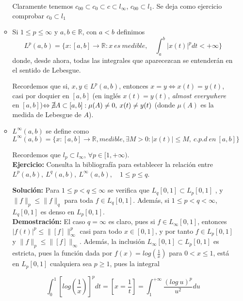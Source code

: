\documentclass{article}
\begin{document}
\begin{enumerate}
\begin{itemize}
	Claramente tenemos $c_{00}\subset c_0\subset c\subset l_{\infty}$, $c_{00}\subset l_1$. Se deja como ejercicio comprobar $c_0\subset l_1$
	
	\item Si $1\leq p\leq \infty $ y $a,b\in \mathbb{R}$, con $a<b$ definimos
	\begin{equation}
	L^p(a,b)=\{x:[a,b]\rightarrow \mathbb{R}:x\:es\:medible,\quad \int_a^b|x(t)|^p dt<+\infty \}
	\end{equation}
	donde, desde ahora, todas las integrales que aparecezcan se entenderán en el sentido de Lebesgue.
	
	Recordemos que si, $x,y\in L^p(a,b)$, entonces $x=y\Leftrightarrow x(t)=y(t)$, casi por doquier en $[a,b]$ (en inglés $x(t)=y(t)$, \textit{almost everywhere} en $[a,b]$)$\Leftrightarrow \cancel{\exists} A\subset [a,b]:\mu(A)\neq0,\:x(t)\neq y(t)$ (donde $\mu(A)$ es la medida de Lebesgue de $A$).
	
	\item $L^\infty(a,b)$ se define como
	\begin{equation*}
	L^\infty(a,b)=\{x:[a,b]\rightarrow \mathbb{R},medible,\exists M>0:|x(t)|\leq M,\:c.p.d\:en\:[a,b]\}
	\end{equation*}	
	
	Recordemos que $l_p\subset l_\infty$, $\forall p\in [1,+\infty)$.\\
	
	\textbf{Ejercicio:} Consulta la bibliografía para establecer la relación entre $L^p(a,b),\:L^q(a,b),\:L^\infty (a,b),\quad 1\leq p\leq q$.
	
	\textbf{Solución:} Para $1\leq p < q \leq \infty$ se verifica que $L_q[0,1] \subset L_p[0,1]$ , y $\|f\|_p\leq \|f\|_q$ para toda $f\in L_q[0,1]$. Además, si $1\leq p<q<\infty$, $L_q[0,1]$ es denso en $L_p[0,1]$. \\
	
	\textbf{Demostración:} El caso $q=\infty$ es claro, pues si $f\in L_\infty[0,1]$, entonces $|f(t)|^p\leq \|[f]\|_\infty^p$ casi para todo $x\in [0,1]$, y por tanto $f\in L_p[0,1]$ y $\|f\|_p\leq \|[f]\|_\infty$. Además, la inclusión $L_\infty
	[0,1]\subset L_p[0,1]$ es estricta, pues la función dada por $f(x)=log(\frac{1}{x})$ para $0<x\leq 1$, está en $L_p[0,1]$ cualquiera sea $p\geq 1$, pues la integral

	\begin{equation*}
	\int_0^1\left[log(\frac{1}{x})\right]^p dt=\left[ x=\frac{1}{t}\right] =\int_1^{+\infty} \frac{(log\:u)^p}{u^2} du
	\end{equation*}	
	

\end{itemize}
\end{enumerate}
\end{document}
